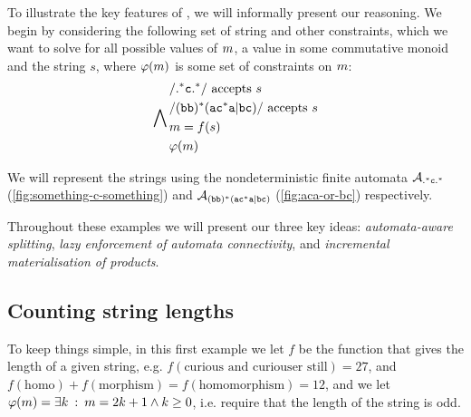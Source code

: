\documentclass[acmsmall,review,anonymous,screen]{acmart}\settopmatter{printfolios=true,printccs=true,printacmref=true}
\theoremstyle{definition}
\begin{document}
To illustrate the key features of \Calculus, we will informally present our
reasoning. We begin by considering the following set of string and other
constraints, which we want to solve for all possible values of $m$,
a value in some commutative monoid and the string $s$, where
$\varphi(m)$ is some set of constraints on $m$:
\begin{equation*}
  \bigwedge\limits_{} \begin{aligned}
  & \mathtt{/}\mathtt{.^\ast{}c.^\ast}{}\mathtt{/} \text{ accepts } s\\
  & \mathtt{/}\mathtt{(bb)^\ast(ac^\ast{}a|bc)}{}\mathtt{/} \text{ accepts } s \\
  & m = f(s) \\
  & \varphi(m)
  \end{aligned}
 \end{equation*}

We will represent the strings using the nondeterministic finite automata
 $\mathcal{A}_{\mathtt{.^\ast{}c.^\ast}}{}$ (\cref{fig:something-c-something}) and $\mathcal{A}_{\mathtt{(bb)^\ast(ac^\ast{}a|bc)}}{}$
 (\cref{fig:aca-or-bc}) respectively.

 Throughout these examples we will present our three key ideas:
 \emph{automata-aware splitting}, \emph{lazy enforcement of automata
 connectivity}, and \emph{incremental materialisation of products}.
 
\subsection{Counting string lengths}

To keep things simple, in this first example we let $f$ be the function that
gives the length of a given string, e.g. $f\left(\text{curious and curiouser
still}\right) = 27$, and $f\left(\text{homo}\right) +
f\left(\text{morphism}\right) = f\left(\text{homomorphism}\right) = 12$, and we
let $\varphi(m) = \exists k \::\: m = 2k + 1 \land k \geq 0$,
i.e. require that the length of the string is odd.
\end{document}
